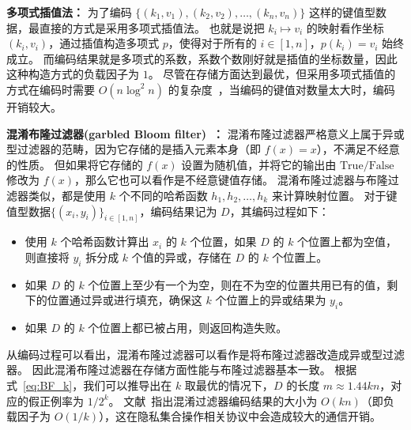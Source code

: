 \textbf{多项式插值法：}
为了编码 $\{(k_1, v_1), (k_2, v_2), \dots, (k_n, v_n)\}$ 这样的键值型数据，最直接的方式是采用多项式插值法。
也就是说把 $k_i \mapsto v_i$ 的映射看作坐标 $(k_i, v_i)$，通过插值构造多项式 $p$，使得对于所有的 $i\in[1,n]$，$p(k_i) = v_i$ 始终成立。
而编码结果就是多项式的系数，系数个数刚好就是插值的坐标数量，因此这种构造方式的负载因子为 $1$。
尽管在存储方面达到最优，但采用多项式插值的方式在编码时需要 $O(n\log^2n)$ 的复杂度~\cite{moenck1972Fast}，当编码的键值对数量太大时，编码开销较大。

\textbf{混淆布隆过滤器(garbled Bloom filter)~\cite{dong2013when}：}
混淆布隆过滤器严格意义上属于异或型过滤器的范畴，因为它存储的是插入元素本身（即 $f(x) = x$），不满足不经意的性质。
但如果将它存储的 $f(x)$ 设置为随机值，并将它的输出由 $\mbox{True}/\mbox{False}$ 修改为 $f(x)$，那么它也可以看作是不经意键值存储。
混淆布隆过滤器与布隆过滤器类似，都是使用 $k$ 个不同的哈希函数 $h_1, h_2, \dots, h_k$ 来计算映射位置。
对于键值型数据$\{(x_i, y_i)\}_{i\in [1, n]}$，编码结果记为 $D$，其编码过程如下：
\begin{itemize}
  \item 使用 $k$ 个哈希函数计算出 $x_i$ 的 $k$ 个位置，如果 $D$ 的 $k$ 个位置上都为空值，则直接将 $y_i$ 拆分成 $k$ 个值的异或，存储在 $D$ 的 $k$ 个位置上。
  \item 如果 $D$ 的 $k$ 个位置上至少有一个为空，则在不为空的位置共用已有的值，剩下的位置通过异或进行填充，确保这 $k$ 个位置上的异或结果为 $y_i$。
  \item 如果 $D$ 的 $k$ 个位置上都已被占用，则返回构造失败。
\end{itemize}
从编码过程可以看出，混淆布隆过滤器可以看作是将布隆过滤器改造成异或型过滤器。
因此混淆布隆过滤器在存储方面性能与布隆过滤器基本一致。
根据式~\ref{eq:BF_k}，我们可以推导出在 $k$ 取最优的情况下，$D$ 的长度 $m\approx1.44 kn$，对应的假正例率为 $1/2^k$。
文献~\cite{garimella2021oblivious}指出混淆过滤器编码结果的大小为 $O(kn)$（即负载因子为 $O(1/k)$），这在隐私集合操作相关协议中会造成较大的通信开销。

